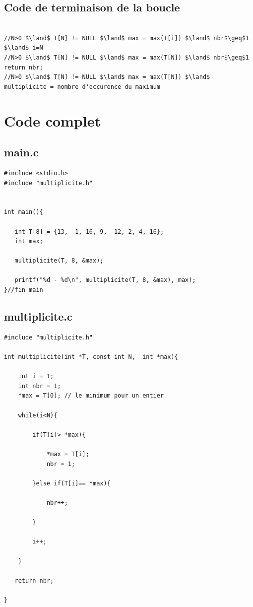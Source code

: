 \documentclass[a4paper, 11pt, oneside]{article}
\begin{document}
\subsection{Code de terminaison de la boucle}

\begin{lstlisting}[caption={Code de terminaison de la boucle}]

//N>0 $\land$ T[N] != NULL $\land$ max = max(T[i]) $\land$ nbr$\geq$1 $\land$ i=N
//N>0 $\land$ T[N] != NULL $\land$ max = max(T[N]) $\land$ nbr$\geq$1
return nbr;
//N>0 $\land$ T[N] != NULL $\land$ max = max(T[N]) $\land$ multiplicite = nombre d'occurence du maximum

\end{lstlisting}


\section{Code complet}


\subsection{main.c}

\begin{lstlisting}[caption={Main.c}]
#include <stdio.h>
#include "multiplicite.h"


int main(){

   int T[8] = {13, -1, 16, 9, -12, 2, 4, 16};
   int max;

   multiplicite(T, 8, &max);

   printf("%d - %d\n", multiplicite(T, 8, &max), max);
}//fin main
\end{lstlisting}


\subsection{multiplicite.c}

\begin{lstlisting}[caption={multiplicite.c}]
#include "multiplicite.h"

int multiplicite(int *T, const int N,  int *max){
   
    int i = 1;
    int nbr = 1;
    *max = T[0]; // le minimum pour un entier 

    while(i<N){

        if(T[i]> *max){

            *max = T[i];
            nbr = 1;

        }else if(T[i]== *max){

            nbr++;

        }

        i++;

    }

   return nbr;

}
\end{lstlisting}
\end{document}
